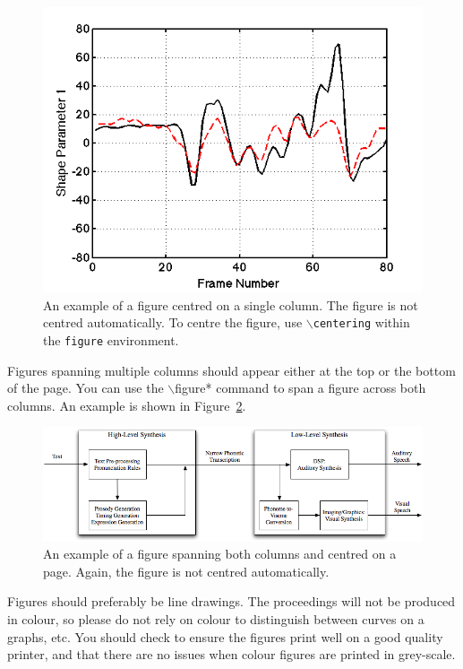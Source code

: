\documentclass{cmppgr}
\begin{document}
\begin{figure}[h]
\centering
\includegraphics[scale=0.4]{sparam_1_errors}
\caption{An example of a figure centred on a single column. The figure is not centred automatically. To centre the figure, use \texttt{$\backslash$centering} within the \texttt{figure} environment.}
\label{fig:columnfigure}
\end{figure}

Figures spanning multiple columns should appear either at the top or the bottom of the page. You can use the $\backslash$figure* command to span a figure across both columns. An example is shown in Figure~\ref{fig:pagefigure}.

\begin{figure}[tb]
\centering
\includegraphics[scale=0.5]{AVTTS-Overview}
\caption{An example of a figure spanning both columns and centred on a page. Again, the figure is not centred automatically.}
\label{fig:pagefigure}
\end{figure}

Figures should preferably be line drawings. The proceedings will not be produced in colour, so please do not rely on colour to distinguish between curves on a graphs, etc. You should check to ensure the figures print well on a good quality printer, and that there are no issues when colour figures are printed in grey-scale.
\end{document}

